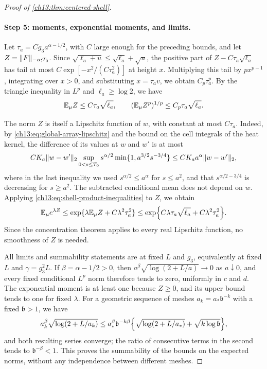 \begin{proof}[Proof of \cref{ch13:thm:centered-shell}]
\paragraph{Step 5: moments, exponential moments, and limits.}
Let $\tau_a=Cg_3a^{\alpha-1/2}$, with $C$ large enough for the preceding bounds, and let $Z=\lVert F\rVert_{-\alpha;T_0}$. Since $\sqrt{\ell_a+u}\le\sqrt{\ell_a}+\sqrt u$, the positive part of $Z-C\tau_a\sqrt{\ell_a}$ has tail at most $C\exp[-x^2/(C\tau_a^2)]$ at height $x$. Multiplying this tail by $px^{p-1}$, integrating over $x>0$, and substituting $x=\tau_av$, we obtain $C_p\tau_a^p$. By the triangle inequality in $L^p$ and $\ell_a\ge\log2$, we have
\[
 \mathbb E_\mu Z\le C\tau_a\sqrt{\ell_a},\qquad(\mathbb E_\mu Z^p)^{1/p}\le C_p\tau_a\sqrt{\ell_a}.
\]

The norm $Z$ is itself a Lipschitz function of $w$, with constant at most $C\tau_a$. Indeed, by \eqref{ch13:eq:global-array-lipschitz} and the bound on the cell integrals of the heat kernel, the difference of its values at $w$ and $w'$ is at most
\[
 CK_a\lVert w-w'\rVert_2\sup_{0<s\le T_0}s^{\alpha/2}\min\{1,a^{3/2}s^{-3/4}\}\le CK_aa^\alpha\lVert w-w'\rVert_2,
\]
where in the last inequality we used $s^{\alpha/2}\le a^\alpha$ for $s\le a^2$, and that $s^{\alpha/2-3/4}$ is decreasing for $s\ge a^2$. The subtracted conditional mean does not depend on $w$. Applying \eqref{ch13:eq:shell-product-inequalities} to $Z$, we obtain
\[
 \mathbb E_\mu e^{\lambda Z}\le\exp\{\lambda\mathbb E_\mu Z+C\lambda^2\tau_a^2\}\le\exp\Bigl\{C\lambda\tau_a\sqrt{\ell_a}+C\lambda^2\tau_a^2\Bigr\}.
\]
Since the concentration theorem applies to every real Lipschitz function, no smoothness of $Z$ is needed.

All limits and summability statements are at fixed $L$ and $g_3$, equivalently at fixed $L$ and $\gamma=g_3^2L$. If $\beta=\alpha-1/2>0$, then $a^\beta\sqrt{\log(2+L/a)}\to0$ as $a\downarrow0$, and every fixed conditional $L^p$ norm therefore tends to zero, uniformly in $c$ and $d$. The exponential moment is at least one because $Z\ge0$, and its upper bound tends to one for fixed $\lambda$. For a geometric sequence of meshes $a_k=a_*\mathfrak b^{-k}$ with a fixed $\mathfrak b>1$, we have
\[
 a_k^\beta\sqrt{\log(2+L/a_k)}\le a_*^\beta\mathfrak b^{-k\beta}\Bigl\{\sqrt{\log(2+L/a_*)}+\sqrt{k\log\mathfrak b}\Bigr\},
\]
and both resulting series converge; the ratio of consecutive terms in the second tends to $\mathfrak b^{-\beta}<1$. This proves the summability of the bounds on the expected norms, without any independence between different meshes.


\end{proof}
